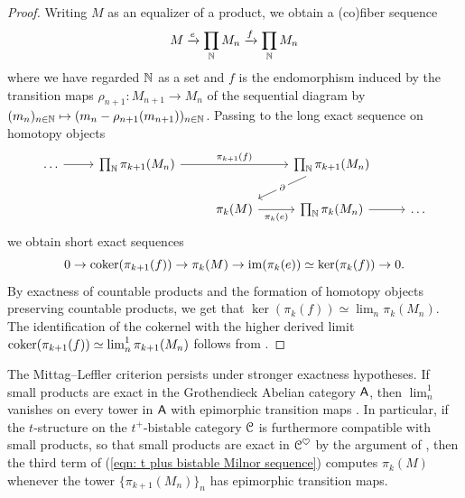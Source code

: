 \begin{proof}
    Writing $M$ as an equalizer of a product, we obtain a (co)fiber sequence 
    $$M\xrightarrow{e}\prod_{\mathbb{N}}M_{n}\xrightarrow{f}\prod_{\mathbb{N}}M_{n}$$
    where we have regarded $\mathbb{N}$ as a set and $f$ is the endomorphism induced by the transition maps $\rho_{n+1}:M_{n+1}\to M_{n}$ of the sequential diagram by $(m_{n})_{n\in\mathbb{N}}\mapsto(m_{n}-\rho_{n+1}(m_{n+1}))_{n\in\mathbb{N}}$. Passing to the long exact sequence on homotopy objects 
    $$%
    \begin{tikzcd}
        \dots & {\prod_{\NN}\pi_{k+1}(M_{n})} && {\prod_{\NN}\pi_{k+1}(M_{n})} & \\
        && {\pi_{k}(M)} & {\prod_{\NN}\pi_{k}(M_{n})} & \dots
        \arrow[from=1-1, to=1-2]
        \arrow["{\pi_{k+1}(f)}", from=1-2, to=1-4]
        \arrow["\partial"{description}, from=1-4, to=2-3]
        \arrow["{\pi_{k}(e)}"', from=2-3, to=2-4]
        \arrow[from=2-4, to=2-5]
    \end{tikzcd}$$
    we obtain short exact sequences 
    \begin{equation}\label{eqn: Milnor SES}
        0\to\mathrm{coker}(\pi_{k+1}(f))\to\pi_{k}(M)\to\mathrm{im}(\pi_{k}(e))\simeq\ker(\pi_{k}(f))\to0.
    \end{equation}
    By exactness of countable products and the formation of homotopy objects preserving countable products, we get that $\ker(\pi_{k}(f))\simeq\lim_{n}\pi_{k}(M_{n})$. The identification of the cokernel with the higher derived limit $\mathrm{coker}(\pi_{k+1}(f))\simeq\lim_{n}^{1}\pi_{k+1}(M_{n})$ follows from \cite[Lem. 2.2]{RoosLimits}. 
\end{proof}
\begin{remark}\label{rmk: Mittag-Leffler under exact products}
    The Mittag--Leffler criterion persists under stronger exactness hypotheses. If small products are exact in the Grothendieck Abelian category $\mathsf{A}$, then $\lim_{n}^{1}$ vanishes on every tower in $\mathsf{A}$ with epimorphic transition maps \cite[Thm. 3.1]{RoosLimits}. In particular, if the $t$-structure on the $t^{+}$-bistable category $\EuScript{C}$ is furthermore compatible with small products, so that small products are exact in $\EuScript{C}^{\heartsuit}$ by the argument of , then the third term of (\ref{eqn: t plus bistable Milnor sequence}) computes $\pi_{k}(M)$ whenever the tower $\{\pi_{k+1}(M_{n})\}_{n}$ has epimorphic transition maps. 
\end{remark}
